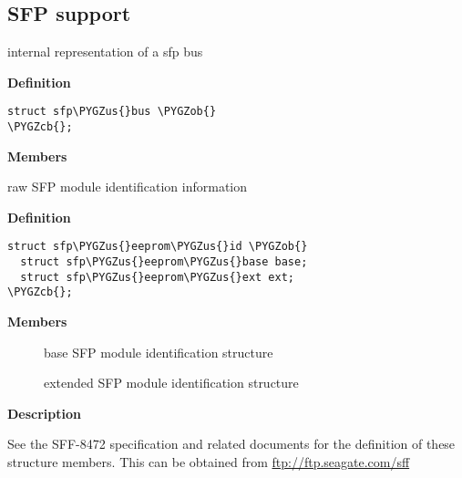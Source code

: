 \documentclass[a4paper,8pt,english]{sphinxmanual}
\def\PYGZus{\char`\_}
\def\PYGZob{\char`\{}
\def\PYGZcb{\char`\}}
\begin{document}
\subsection{SFP support}
\label{networking/kapi:sfp-support}

\begin{fulllineitems}
\label{networking/kapi:c.sfp_bus}
internal representation of a sfp bus

\end{fulllineitems}


\textbf{Definition}

\begin{Verbatim}[commandchars=\\\{\}]
struct sfp\PYGZus{}bus \PYGZob{}
\PYGZcb{};
\end{Verbatim}

\textbf{Members}

\begin{fulllineitems}
\label{networking/kapi:c.sfp_eeprom_id}
raw SFP module identification information

\end{fulllineitems}


\textbf{Definition}

\begin{Verbatim}[commandchars=\\\{\}]
struct sfp\PYGZus{}eeprom\PYGZus{}id \PYGZob{}
  struct sfp\PYGZus{}eeprom\PYGZus{}base base;
  struct sfp\PYGZus{}eeprom\PYGZus{}ext ext;
\PYGZcb{};
\end{Verbatim}

\textbf{Members}
\begin{description}
\item[{}] \leavevmode
base SFP module identification structure

\item[{}] \leavevmode
extended SFP module identification structure

\end{description}

\textbf{Description}

See the SFF-8472 specification and related documents for the definition
of these structure members. This can be obtained from
\href{ftp://ftp.seagate.com/sff}{ftp://ftp.seagate.com/sff}
\end{document}
